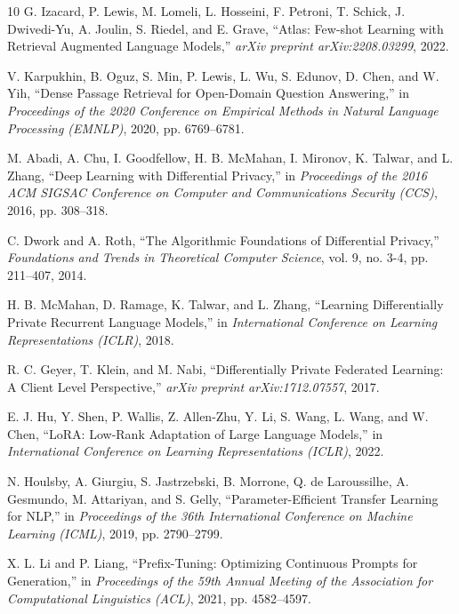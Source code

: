 \documentclass[conference]{IEEEtran}
\begin{document}
\begin{thebibliography}{10}
G. Izacard, P. Lewis, M. Lomeli, L. Hosseini, F. Petroni, T. Schick, J. Dwivedi-Yu, A. Joulin, S. Riedel, and E. Grave,
``Atlas: Few-shot Learning with Retrieval Augmented Language Models,''
\textit{arXiv preprint arXiv:2208.03299}, 2022.

V. Karpukhin, B. Oguz, S. Min, P. Lewis, L. Wu, S. Edunov, D. Chen, and W. Yih,
``Dense Passage Retrieval for Open-Domain Question Answering,''
in \textit{Proceedings of the 2020 Conference on Empirical Methods in Natural Language Processing (EMNLP)}, 2020, pp. 6769--6781.

M. Abadi, A. Chu, I. Goodfellow, H. B. McMahan, I. Mironov, K. Talwar, and L. Zhang,
``Deep Learning with Differential Privacy,''
in \textit{Proceedings of the 2016 ACM SIGSAC Conference on Computer and Communications Security (CCS)}, 2016, pp. 308--318.

C. Dwork and A. Roth,
``The Algorithmic Foundations of Differential Privacy,''
\textit{Foundations and Trends in Theoretical Computer Science}, vol. 9, no. 3-4, pp. 211--407, 2014.

H. B. McMahan, D. Ramage, K. Talwar, and L. Zhang,
``Learning Differentially Private Recurrent Language Models,''
in \textit{International Conference on Learning Representations (ICLR)}, 2018.

R. C. Geyer, T. Klein, and M. Nabi,
``Differentially Private Federated Learning: A Client Level Perspective,''
\textit{arXiv preprint arXiv:1712.07557}, 2017.

E. J. Hu, Y. Shen, P. Wallis, Z. Allen-Zhu, Y. Li, S. Wang, L. Wang, and W. Chen,
``LoRA: Low-Rank Adaptation of Large Language Models,''
in \textit{International Conference on Learning Representations (ICLR)}, 2022.

N. Houlsby, A. Giurgiu, S. Jastrzebski, B. Morrone, Q. de Laroussilhe, A. Gesmundo, M. Attariyan, and S. Gelly,
``Parameter-Efficient Transfer Learning for NLP,''
in \textit{Proceedings of the 36th International Conference on Machine Learning (ICML)}, 2019, pp. 2790--2799.

X. L. Li and P. Liang,
``Prefix-Tuning: Optimizing Continuous Prompts for Generation,''
in \textit{Proceedings of the 59th Annual Meeting of the Association for Computational Linguistics (ACL)}, 2021, pp. 4582--4597.


\end{thebibliography}
\end{document}
